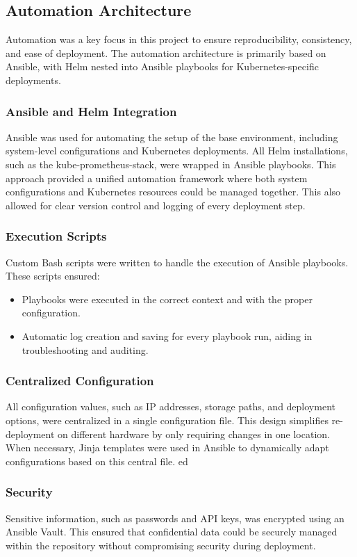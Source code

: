 \subsection{Automation Architecture}

Automation was a key focus in this project to ensure reproducibility, consistency, and ease of deployment. The automation architecture is primarily based on Ansible, with Helm nested into Ansible playbooks for Kubernetes-specific deployments.

\subsubsection{Ansible and Helm Integration}
Ansible was used for automating the setup of the base environment, including system-level configurations and Kubernetes deployments. All Helm installations, such as the kube-prometheus-stack, were wrapped in Ansible playbooks. This approach provided a unified automation framework where both system configurations and Kubernetes resources could be managed together. This also allowed for clear version control and logging of every deployment step.

\subsubsection{Execution Scripts}
Custom Bash scripts were written to handle the execution of Ansible playbooks. These scripts ensured:
\begin{itemize}
    \item Playbooks were executed in the correct context and with the proper configuration.
    \item Automatic log creation and saving for every playbook run, aiding in troubleshooting and auditing.
\end{itemize}

\subsubsection{Centralized Configuration}
All configuration values, such as IP addresses, storage paths, and deployment options, were centralized in a single configuration file. This design simplifies re-deployment on different hardware by only requiring changes in one location. When necessary, Jinja templates were used in Ansible to dynamically adapt configurations based on this central file.
ed
\subsubsection{Security}
Sensitive information, such as passwords and API keys, was encrypted using an Ansible Vault. This ensured that confidential data could be securely managed within the repository without compromising security during deployment.




